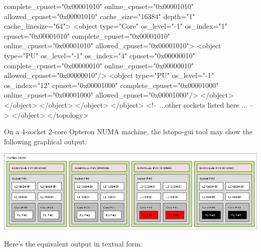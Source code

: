 \begin{DoxyVerb}
              complete_cpuset="0x00001010" online_cpuset="0x00001010" 
              allowed_cpuset="0x00001010" cache_size="16384" depth="1" 
              cache_linesize="64">
            <object type="Core" os_level="-1" os_index="1" cpuset="0x00001010" 
                complete_cpuset="0x00001010" online_cpuset="0x00001010" 
                allowed_cpuset="0x00001010">
              <object type="PU" os_level="-1" os_index="4" cpuset="0x00000010" 
                  complete_cpuset="0x00000010" online_cpuset="0x00000010" 
                  allowed_cpuset="0x00000010"/>
              <object type="PU" os_level="-1" os_index="12" cpuset="0x00001000" 
                  complete_cpuset="0x00001000" online_cpuset="0x00001000" 
                  allowed_cpuset="0x00001000"/>
            </object>
          </object>
        </object>
      </object>
    </object>
    <!-- ...other sockets listed here ... -->
  </object>
</topology>
\end{DoxyVerb}


On a 4-\/socket 2-\/core Opteron NUMA machine, the {\ttfamily lstopo-\/gui} tool may show the following graphical output:

 
\begin{DoxyImageNoCaption}
  \mbox{\includegraphics[width=\textwidth]{hagrid.png}}
\end{DoxyImageNoCaption}


Here's the equivalent output in textual form:



